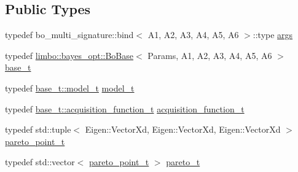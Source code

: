 \subsection*{Public Types}
\begin{DoxyCompactItemize}
\item 
typedef bo\+\_\+multi\+\_\+signature\+::bind$<$ A1, A2, A3, A4, A5, A6 $>$\+::type \hyperlink{classlimbo_1_1experimental_1_1bayes__opt_1_1_bo_multi_afbec2602c4a22ad0a1285cc813a51c58}{args}
\item 
typedef \hyperlink{classlimbo_1_1bayes__opt_1_1_bo_base}{limbo\+::bayes\+\_\+opt\+::\+Bo\+Base}$<$ Params, A1, A2, A3, A4, A5, A6 $>$ \hyperlink{classlimbo_1_1experimental_1_1bayes__opt_1_1_bo_multi_ab5e0a9d998083ff1063045d289683287}{base\+\_\+t}
\item 
typedef \hyperlink{classlimbo_1_1bayes__opt_1_1_bo_base_a151af5c7eef92a82d8813bb2e067d267}{base\+\_\+t\+::model\+\_\+t} \hyperlink{classlimbo_1_1experimental_1_1bayes__opt_1_1_bo_multi_a94e37f45e30ac591bacf36df6767d6ad}{model\+\_\+t}
\item 
typedef \hyperlink{classlimbo_1_1bayes__opt_1_1_bo_base_a200a43abb6c95d2d99660898b36f2200}{base\+\_\+t\+::acquisition\+\_\+function\+\_\+t} \hyperlink{classlimbo_1_1experimental_1_1bayes__opt_1_1_bo_multi_af5c8c4b0a4912c1efa5e0156a83b06ab}{acquisition\+\_\+function\+\_\+t}
\item 
typedef std\+::tuple$<$ Eigen\+::\+Vector\+Xd, Eigen\+::\+Vector\+Xd, Eigen\+::\+Vector\+Xd $>$ \hyperlink{classlimbo_1_1experimental_1_1bayes__opt_1_1_bo_multi_a1a48dd47159458edc16374082379879e}{pareto\+\_\+point\+\_\+t}
\item 
typedef std\+::vector$<$ \hyperlink{classlimbo_1_1experimental_1_1bayes__opt_1_1_bo_multi_a1a48dd47159458edc16374082379879e}{pareto\+\_\+point\+\_\+t} $>$ \hyperlink{classlimbo_1_1experimental_1_1bayes__opt_1_1_bo_multi_ae2b586fb9056fdfba859b288927a2f1c}{pareto\+\_\+t}
\end{DoxyCompactItemize}
